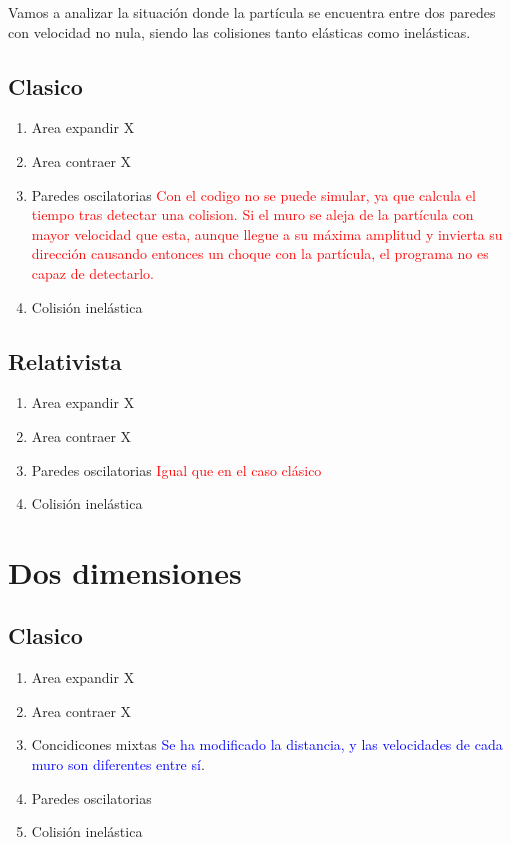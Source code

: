\documentclass[11pt, spanish]{book}
\begin{document}
Vamos a analizar la situación donde la partícula se encuentra entre dos paredes con velocidad no nula, siendo las colisiones tanto elásticas como inelásticas.

\subsection{Clasico}
\begin{enumerate}
    \item Area expandir X
    \item Area contraer X
    \item  Paredes oscilatorias \textcolor{red}{Con el codigo no se puede simular, ya que calcula el tiempo tras detectar una colision. Si el muro se aleja de la partícula con mayor velocidad que esta, aunque llegue a su máxima amplitud y invierta su dirección causando entonces un choque con la partícula, el programa no es capaz de detectarlo.}
    \item Colisión inelástica
\end{enumerate}
\subsection{Relativista}
\begin{enumerate}
    \item Area expandir X
    \item Area contraer X
    \item  Paredes oscilatorias \textcolor{red}{Igual que en el caso clásico}
    \item Colisión inelástica
\end{enumerate}
\section{Dos dimensiones}

\subsection{Clasico}
\begin{enumerate}
    \item Area expandir X
    \item Area contraer X
    \item Concidicones mixtas \textcolor{blue}{Se ha modificado la distancia, y las velocidades de cada muro son diferentes entre sí}.
    \item Paredes oscilatorias
    \item Colisión inelástica
\end{enumerate}
\end{document}

